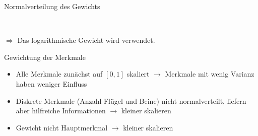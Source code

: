 \documentclass{beamer}
\begin{document}
\begin{frame}{Normalverteilung des Gewichts}
 \centering
 \begin{figure}
  ~
  ~
 \end{figure}
 $\Rightarrow$ Das logarithmische Gewicht wird verwendet.
\end{frame}

\begin{frame}{Gewichtung der Merkmale}
 \begin{itemize}
  \item Alle Merkmale zunächst auf $[0, 1]$ skaliert $\rightarrow$ Merkmale mit wenig Varianz haben weniger Einfluss
  \item Diskrete Merkmale (Anzahl Flügel und Beine) nicht normalverteilt, liefern aber hilfreiche Informationen $\rightarrow$ kleiner skalieren
  \item Gewicht nicht Hauptmerkmal $\rightarrow$ kleiner skalieren
 \end{itemize}
\end{frame}
\end{document}
